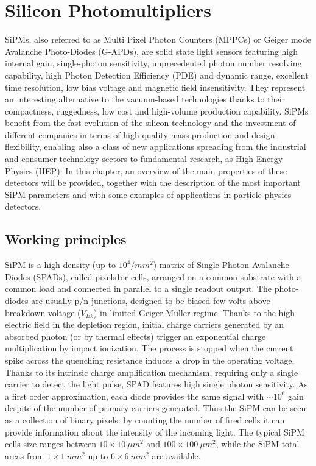 \chapter{Silicon Photomultipliers}
SiPMs, also referred to as Multi Pixel Photon Counters (MPPCs) or Geiger mode Avalanche Photo-Diodes (G-APDs), are solid state light sensors featuring high internal gain, single-photon sensitivity, unprecedented photon number resolving capability, high Photon Detection Efficiency (PDE) and dynamic range, excellent time resolution, low bias voltage and magnetic field insensitivity. They represent an interesting alternative to the vacuum-based technologies thanks to their compactness, ruggedness, low cost and high-volume production capability. SiPMs benefit from the fast evolution of the silicon technology and the investment of different companies in terms of high quality mass production and design flexibility, enabling also a class of new applications spreading from the industrial and consumer technology sectors to fundamental research,  as High Energy Physics (HEP).  In this chapter, an overview of the main properties of these detectors will be provided, together with the description of the most important SiPM parameters and with some examples of applications in particle physics detectors.

\section{Working principles}
SiPM is a high density (up to $10^4/mm^2$) matrix of Single-Photon Avalanche Diodes (SPADs), called pixels1or cells, arranged on a common substrate with a common load and connected in parallel to a single readout output.   The photo-diodes are usually p/n junctions, designed to be biased few volts above breakdown voltage ($V_{Bk}$) in limited Geiger-Müller regime. Thanks to the high electric field in the depletion region, initial charge carriers generated by an absorbed photon (or by thermal effects) trigger an exponential charge multiplication by impact ionization. The process is stopped when the current spike across the quenching resistance induces a drop in the operating voltage. Thanks to its intrinsic charge amplification mechanism, requiring only a single carrier to detect the light pulse,  SPAD features high single photon sensitivity. As a first order approximation, each diode provides the same signal with $\sim 10^6$ gain despite of the number of primary carriers generated.   Thus the SiPM can be seen as a collection of binary pixels: by counting the number of fired cells it can provide information about the intensity of the incoming light.  The typical SiPM cells size ranges between $10\times 10\ \mu m^2$ and $100\times 100\ \mu m^2$, while the SiPM total areas from $1\times 1\ mm^2$ up to $6\times 6\ mm^2$ are available.

